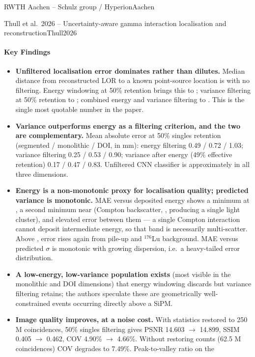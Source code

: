 \begin{programnote}{RWTH Aachen -- Schulz group / Hyperion}{Aachen}
\begin{papernote}{Thull et al.\ 2026 -- Uncertainty-aware gamma interaction localisation and reconstruction}{Thull2026}
\paragraph{Key Findings}
\begin{itemize}
    \item \textbf{Unfiltered localisation error dominates rather than dilutes.} Median
        distance from reconstructed LOR to a known point-source location is
        \textbf{} with no filtering. Energy windowing at 50\% retention brings this
        to ; variance filtering at 50\% retention to ; combined energy and
        variance filtering to \textbf{}. This is the single most quotable number
        in the paper.
    \item \textbf{Variance outperforms energy as a filtering criterion, and the two are
        complementary.} Mean absolute error at 50\% singles retention (segmented /
        monolithic / DOI, in mm): energy filtering 0.49 / 0.72 / 1.03; variance filtering
        0.25 / 0.53 / 0.90; variance after energy (49\% effective retention)
        0.17 / 0.47 / 0.83. Unfiltered CNN classifier is approximately  in all three
        dimensions.
    \item \textbf{Energy is a non-monotonic proxy for localisation quality; predicted
        variance is monotonic.} MAE versus deposited energy shows a minimum at , a
        second minimum near  (Compton backscatter, , producing a single
        light cluster), and elevated error between them --- a single Compton interaction
        cannot deposit intermediate energy, so that band is necessarily multi-scatter.
        Above , error rises again from pile-up and $^{176}$Lu background. MAE versus
        predicted $\sigma$ is monotonic with growing dispersion, i.e.\ a heavy-tailed error
        distribution.
    \item \textbf{A low-energy, low-variance population exists} (most visible in the
        monolithic and DOI dimensions) that energy windowing discards but variance
        filtering retains; the authors speculate these are geometrically well-constrained
        events occurring directly above a SiPM.
    \item \textbf{Image quality improves, at a noise cost.} With statistics restored to
        250 M coincidences, 50\% singles filtering gives PSNR 14.603 $\to$ 14.899,
        SSIM 0.405 $\to$ 0.462, COV 4.90\% $\to$ 4.66\%. Without restoring counts
        (62.5 M coincidences) COV degrades to 7.49\%. Peak-to-valley ratio on the 

\end{itemize}
\end{papernote}
\end{programnote}
